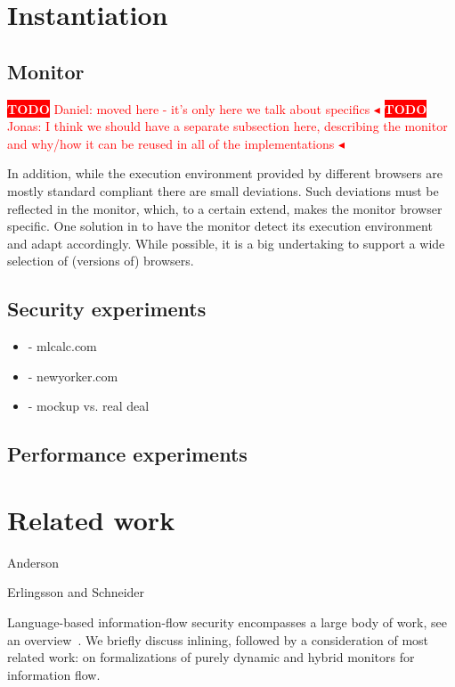\documentclass{llncs}
\newcommand{\todo}[1]{\colorbox{red}{\textcolor{white}{\sffamily\bfseries\scriptsize TODO}} \textcolor{red}{#1} \textcolor{red}{$\blacktriangleleft$}}
\begin{document}

\section{Instantiation}
\label{sec:case}

\subsection{Monitor}

\todo{Daniel: moved here - it's only here we talk about specifics}
\todo{Jonas: I think we should have a separate subsection here, describing the monitor and why/how it can be reused in all of the implementations}

In addition, while the
execution environment provided by different browsers are mostly standard
compliant there are small deviations. Such deviations must be reflected in 
the monitor, which, to a certain extend, makes the monitor browser specific.
One solution in to have the monitor detect its execution environment
and adapt accordingly. While possible, it is a big undertaking to support
a wide selection of (versions of) browsers.


\subsection{Security experiments}

\begin{itemize}
\item- mlcalc.com
\item- newyorker.com
\item- mockup vs. real deal
\end{itemize}

\subsection{Performance experiments}

\section{Related work}
\label{sec:related}

Anderson~\cite{Anderson:72}

Erlingsson and Schneider~\cite{DBLP:conf/nspw/ErlingssonS99}

Language-based information-flow security encompasses a large body of
work, see an overview~\cite{Sabelfeld:Myers:JSAC}. We briefly
discuss inlining, followed by a consideration of most related work: on
formalizations of purely dynamic and hybrid monitors for information flow.
\end{document}
